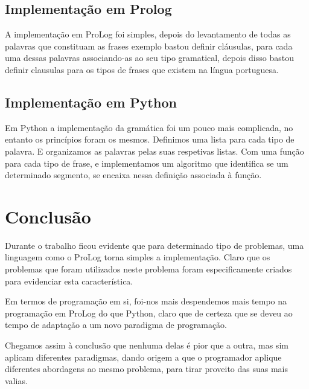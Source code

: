 \documentclass[12pt,a4paper]{article}
\begin{document}
\subsection{Implementação em Prolog}
A implementação em ProLog foi simples, depois do levantamento de todas as palavras que constituam as frases exemplo bastou definir cláusulas, para cada uma dessas palavras associando-as ao seu tipo gramatical, depois disso bastou definir clausulas para os tipos de frases que existem na língua portuguesa.
\subsection{Implementação em Python}
Em Python a implementação da gramática foi um pouco mais complicada, no entanto os princípios foram os mesmos. Definimos uma lista para cada tipo de palavra. E organizamos as palavras pelas suas respetivas listas. Com uma função para cada tipo de frase, e implementamos um algoritmo que identifica se um determinado segmento, se encaixa nessa definição associada à função.
\section{Conclusão}
Durante o trabalho ficou evidente que para determinado tipo de problemas, uma linguagem como o ProLog torna simples a implementação. Claro que os problemas que foram utilizados neste problema foram especificamente criados para evidenciar esta característica.

Em termos de programação em si, foi-nos mais despendemos mais  tempo na programação em ProLog do que Python, claro que de certeza que se deveu ao tempo de adaptação a um novo paradigma de programação.

Chegamos assim à conclusão que nenhuma delas é pior que a outra, mas sim aplicam diferentes paradigmas, dando origem a que o programador aplique diferentes abordagens ao mesmo problema, para tirar proveito das suas mais valias.



\end{document}
